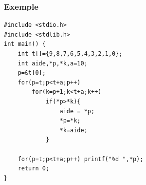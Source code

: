 \documentclass{beamer}
\begin{document}

\begin{frame}[fragile]
\frametitle{Exemple}

\begin{verbatim}
#include <stdio.h>
#include <stdlib.h>
int main() {
    int t[]={9,8,7,6,5,4,3,2,1,0};
    int aide,*p,*k,a=10;
    p=&t[0];
    for(p=t;p<t+a;p++)
        for(k=p+1;k<t+a;k++)
            if(*p>*k){
                aide = *p;
                *p=*k;
                *k=aide;
            }
    
    for(p=t;p<t+a;p++) printf("%d ",*p);
    return 0;
}
\end{verbatim}

\end{frame}
\end{document}
